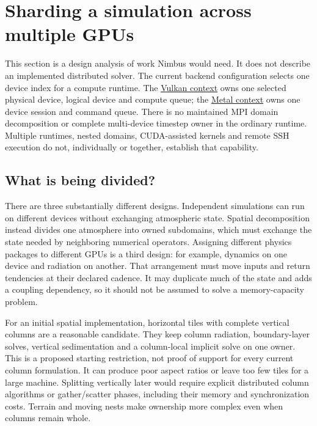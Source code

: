 \section{Sharding a simulation across multiple GPUs}
\label{architecture-multigpu}

This section is a design analysis of work Nimbus would need. It does not
describe an implemented distributed solver. The current backend configuration
selects one device index for a compute runtime. The
\href{../vulkan/include/compute/vulkan_device_context.hpp}{Vulkan context}
owns one selected physical device, logical device and compute queue; the
\href{../metal/src/compute/internal/metal_device_context.hpp}{Metal context}
owns one device session and command queue. There is no maintained MPI domain
decomposition or complete multi-device timestep owner in the ordinary runtime.
Multiple runtimes, nested domains, CUDA-assisted kernels and remote SSH
execution do not, individually or together, establish that capability.

\subsection{What is being divided?}

There are three substantially different designs. Independent simulations can
run on different devices without exchanging atmospheric state. Spatial
decomposition instead divides one atmosphere into owned subdomains, which
must exchange the state needed by neighboring numerical operators. Assigning
different physics packages to different GPUs is a third design: for example,
dynamics on one device and radiation on another. That arrangement must move
inputs and return tendencies at their declared cadence. It may duplicate much
of the state and adds a coupling dependency, so it should not be assumed to
solve a memory-capacity problem.

For an initial spatial implementation, horizontal tiles with complete vertical
columns are a reasonable candidate. They keep column radiation, boundary-layer
solves, vertical sedimentation and a column-local implicit solve on one owner.
This is a proposed starting restriction, not proof of support for every current
column formulation. It can produce poor aspect ratios or leave too few tiles
for a large machine. Splitting vertically later would require explicit
distributed column algorithms or gather/scatter phases, including their
memory and synchronization costs. Terrain and moving nests make ownership
more complex even when columns remain whole.


